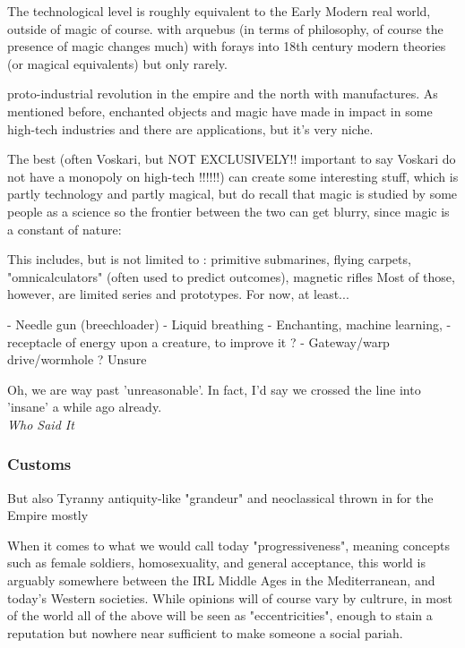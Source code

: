 The technological level is roughly equivalent to the Early Modern real world, outside of magic of course. with arquebus (in terms of philosophy, of course the presence of magic changes much) with forays into 18th century modern theories (or magical equivalents) but only rarely.

proto-industrial revolution in the empire and the north with manufactures. As mentioned before, enchanted objects and magic have made in impact in some high-tech industries and there are applications, but it's very niche.

The best (often Voskari, but NOT EXCLUSIVELY!! important to say Voskari do not have a monopoly on high-tech !!!!!!) can create some interesting stuff, which is partly technology and partly magical, but do recall that magic is studied by some people as a science so the frontier between the two can get blurry, since magic is a constant of nature:




This includes, but is not limited to : primitive submarines, flying carpets, "omnicalculators" (often used to predict outcomes), magnetic rifles
Most of those, however, are limited series and prototypes. For now, at least...


- Needle gun (breechloader)
- Liquid breathing
- Enchanting, machine learning, 
- receptacle of energy upon a creature, to improve it ?
- Gateway/warp drive/wormhole ? Unsure



\begin{rpg-quotebox}
    Oh, we are way past 'unreasonable'. In fact, I'd say we crossed the line into 'insane' a while ago already. \\ \textendash \textit{Who Said It}
\end{rpg-quotebox}


\subsubsection{Customs}

But also Tyranny antiquity-like "grandeur" and neoclassical thrown in for the Empire mostly

When it comes to what we would call today "progressiveness", meaning concepts such as female soldiers, homosexuality, and general acceptance, this world is arguably somewhere between the IRL Middle Ages in the Mediterranean, and today's Western societies. While opinions will of course vary by cultrure, in most of the world all of the above will be seen as "eccentricities", enough to stain a reputation but nowhere near sufficient to make someone a social pariah.

